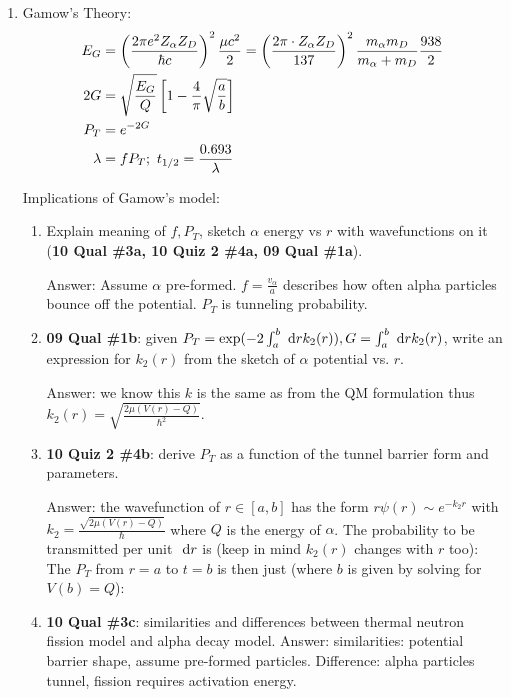 \documentclass{school-22.101-notes}
\begin{document}
\begin{enumerate}
\item Gamow's Theory:
    \begin{align}
    E_G &= \left(\frac{2 \pi e^2 Z_{\alpha} Z_D}{\hbar c}\right)^2 \frac{\mu c^2}{2} = \left( \frac{2 \pi \cdot Z_{\alpha} Z_D}{137} \right)^2 \frac{m_{\alpha} m_D}{m_{\alpha} + m_D} \frac{938}{2} \\
    2G &= \sqrt{\frac{E_G}{Q}} \left[ 1 - \frac{4}{\pi} \sqrt{\frac{a}{b}} \right] \\
    P_T &= e^{-2G} \\
    \lambda &= f P_T; \mbox{ } t_{1/2} = \frac{0.693}{\lambda} 
    \end{align}

Implications of Gamow's model:
\begin{enumerate}
\item Explain meaning of $f, P_T$, sketch $\alpha$ energy vs $r$ with wavefunctions on it (\textbf{10 Qual \#3a, 10 Quiz 2 \#4a, 09 Qual \#1a}). 

Answer: Assume $\alpha$ pre-formed. $f = \frac{v_{\alpha}}{a}$ describes how often alpha particles bounce off the potential. $P_T$ is tunneling probability. 

\item \textbf{09 Qual \#1b}: given $P_T = \exp (- 2 \int_a^b \mbox{ }\mathrm{d} r k_2(r)), G = \int_a^b \mbox{ }\mathrm{d} r k_2 (r)$, write an expression for $k_2(r)$ from the sketch of $\alpha$ potential vs. $r$. 

Answer: we know this $k$ is the same as from the QM formulation thus $\displaystyle k_2 (r) = \sqrt{ \frac{2 \mu (V(r) - Q)}{\hbar^2}}$. 

\item \textbf{10 Quiz 2 \#4b}: derive $P_T$ as a function of the tunnel barrier form and parameters. 

Answer: the wavefunction of $r \in [a,b]$ has the form $r \psi(r) \sim e^{-k_2 r}$ with $k_2 = \frac{\sqrt{2\mu (V(r) - Q)}}{\hbar}$ where $Q$ is the energy of $\alpha$. The probability to be transmitted per unit $\mbox{ }\mathrm{d} r$ is (keep in mind $k_2(r)$ changes with $r$ too): 
The $P_T$ from $r=a$ to $t=b$ is then just (where $b$ is given by solving for $V(b) = Q$): 

\item \textbf{10 Qual \#3c}: similarities and differences between thermal neutron fission model and alpha decay model. Answer: similarities: potential barrier shape, assume pre-formed particles. Difference: alpha particles tunnel, fission requires activation energy. 


\end{enumerate}
\end{enumerate}
\end{document}
